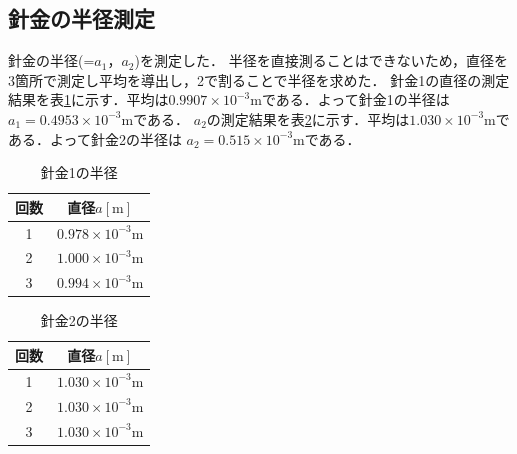 \documentclass[a4paper,11pt]{ltjsarticle}
\begin{document}
\subsection{針金の半径測定}
針金の半径(=$a_1$，$a_2$)を測定した．
半径を直接測ることはできないため，直径を3箇所で測定し平均を導出し，2で割ることで半径を求めた．
針金1の直径の測定結果を表\ref{tab:metal1a1}に示す．平均は$0.9907 \times 10^{-3}\mathrm{m}$である．よって針金1の半径は
$a_1 = 0.4953 \times 10^{-3}\mathrm{m}$である．
$a_2$の測定結果を表\ref{tab:metal2a1}に示す．平均は$1.030 \times 10^{-3}\mathrm{m}$である．よって針金2の半径は
$a_2 = 0.515 \times 10^{-3}\mathrm{m}$である．
\begin{table}[H]
  \centering
  \caption{針金1の半径}
  \label{tab:metal1a1}

  \begin{tabular}{c|c}
    \hline
    回数 & 直径$a[\mathrm{m}]$                \\
    \hline
    1  & $0.978 \times 10^{-3}\mathrm{m}$ \\
    \hline
    2  & $1.000 \times 10^{-3}\mathrm{m}$ \\
    \hline
    3  & $0.994 \times 10^{-3}\mathrm{m}$ \\
    \hline
  \end{tabular}
\end{table}
\begin{table}[H]
  \centering
  \caption{針金2の半径}
  \label{tab:metal2a1}

  \begin{tabular}{c|c}
    \hline
    回数 & 直径$a[\mathrm{m}]$                \\
    \hline
    1  & $1.030 \times 10^{-3}\mathrm{m}$ \\
    \hline
    2  & $1.030 \times 10^{-3}\mathrm{m}$ \\
    \hline
    3  & $1.030 \times 10^{-3}\mathrm{m}$ \\
    \hline
  \end{tabular}
\end{table}
\end{document}
